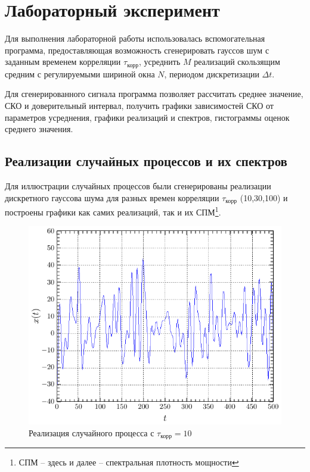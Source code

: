 \documentclass[a4paper,14pt]{extarticle}
\begin{document}
\section{Лабораторный эксперимент}
Для выполнения лабораторной работы использовалась вспомогательная программа, предоставляющая возможность сгенерировать гауссов шум с заданным временем корреляции $\tau_\text{корр}$, усреднить $M$ реализаций скользящим средним с регулируемыми шириной окна $N$, периодом дискретизации $\Delta t$.

Для сгенерированного сигнала программа позволяет рассчитать среднее значение, СКО и доверительный интервал, получить графики зависимостей СКО от параметров усреднения, графики реализаций и спектров, гистограммы оценок среднего значения.

\subsection{Реализации случайных процессов и их спектров}

Для иллюстрации случайных процессов были сгенерированы реализации дискретного гауссова шума для разных времен корреляции $\tau_\text{корр}$ (10,30,100) и построены графики как самих реализаций, так и их СПМ\footnote{СПМ -- здесь и далее -- спектральная плотность мощности}.

\begin{figure}[H]
    \centering
    \includegraphics[width=0.7\linewidth]{fig/x_from_t_10.pdf}
    \vspace{-0.7em}
    \caption{Реализация случайного процесса с $\tau_\text{корр}=10$}
    \label{fig:t10}
\end{figure}
\end{document}
